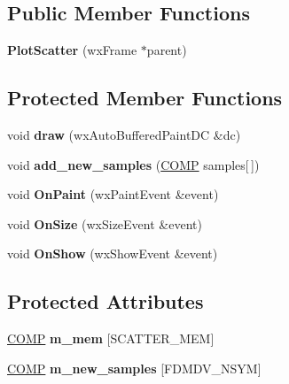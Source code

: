 \subsection*{Public Member Functions}
\begin{DoxyCompactItemize}
\item 
\hypertarget{class_plot_scatter_a3afb429623d26da2e130a53940afae3d}{{\bfseries Plot\-Scatter} (wx\-Frame $\ast$parent)}\label{class_plot_scatter_a3afb429623d26da2e130a53940afae3d}

\end{DoxyCompactItemize}
\subsection*{Protected Member Functions}
\begin{DoxyCompactItemize}
\item 
\hypertarget{class_plot_scatter_aee86ff1a62c9f5131a9e2901078143d6}{void {\bfseries draw} (wx\-Auto\-Buffered\-Paint\-D\-C \&dc)}\label{class_plot_scatter_aee86ff1a62c9f5131a9e2901078143d6}

\item 
\hypertarget{class_plot_scatter_ab88a05eba2000d796fd5d9ce3a722923}{void {\bfseries add\-\_\-new\-\_\-samples} (\hyperlink{struct_c_o_m_p}{C\-O\-M\-P} samples\mbox{[}$\,$\mbox{]})}\label{class_plot_scatter_ab88a05eba2000d796fd5d9ce3a722923}

\item 
\hypertarget{class_plot_scatter_a96f16b57f595b0916a7fa4843aeed53f}{void {\bfseries On\-Paint} (wx\-Paint\-Event \&event)}\label{class_plot_scatter_a96f16b57f595b0916a7fa4843aeed53f}

\item 
\hypertarget{class_plot_scatter_aefccecfa048d8102724295fce801cb4e}{void {\bfseries On\-Size} (wx\-Size\-Event \&event)}\label{class_plot_scatter_aefccecfa048d8102724295fce801cb4e}

\item 
\hypertarget{class_plot_scatter_a7f56259f17e46eea4b223f6e6b4c2a8d}{void {\bfseries On\-Show} (wx\-Show\-Event \&event)}\label{class_plot_scatter_a7f56259f17e46eea4b223f6e6b4c2a8d}

\end{DoxyCompactItemize}
\subsection*{Protected Attributes}
\begin{DoxyCompactItemize}
\item 
\hypertarget{class_plot_scatter_ab0c0683c27bb137bc7bb04aff7de88ab}{\hyperlink{struct_c_o_m_p}{C\-O\-M\-P} {\bfseries m\-\_\-mem} \mbox{[}S\-C\-A\-T\-T\-E\-R\-\_\-\-M\-E\-M\mbox{]}}\label{class_plot_scatter_ab0c0683c27bb137bc7bb04aff7de88ab}

\item 
\hypertarget{class_plot_scatter_a54ec91bd3e57b7648b1ee225de414993}{\hyperlink{struct_c_o_m_p}{C\-O\-M\-P} {\bfseries m\-\_\-new\-\_\-samples} \mbox{[}F\-D\-M\-D\-V\-\_\-\-N\-S\-Y\-M\mbox{]}}\label{class_plot_scatter_a54ec91bd3e57b7648b1ee225de414993}

\end{DoxyCompactItemize}

